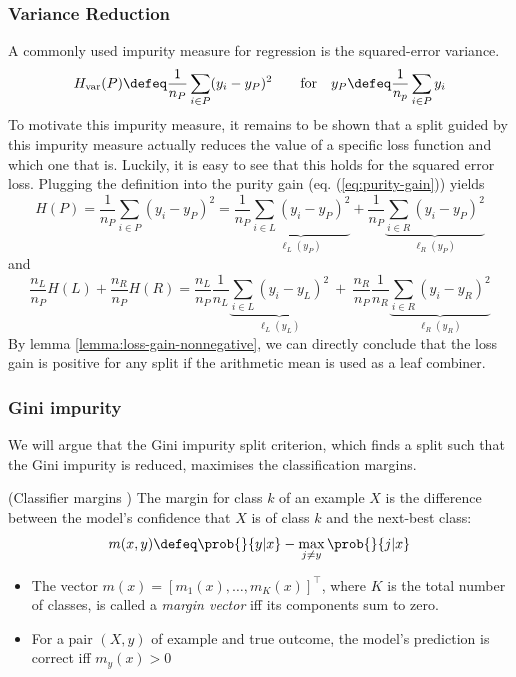 \documentclass[
	twoside=false, %
]{kaobook}
\begin{document}
\subsubsection{Variance Reduction}
A commonly used impurity measure for regression is the squared-error variance. 
$$
H_{\text{var}}(P) \defeq \frac{1}{n_{P}} \sum_{i \in P} (y_{i} - y_{P})^2 \hspace{2em} \text{for} \hspace{1em} y_{P} \defeq \frac{1}{n_{p}}\sum_{i\in P}y_{i}
$$
To motivate this impurity measure, it remains to be shown that a split guided by this impurity measure actually reduces the value of a specific loss function and which one that is. Luckily, it is easy to see that this holds for the squared error loss. Plugging the definition into the purity gain (eq. (\ref{eq:purity-gain})) yields
$$
H(P) = \frac{1}{n_{P}} \sum_{i \in P} (y_{i} - y_{P})^2
= \frac{1}{n_{P}}  
\underbrace{
 \sum_{i \in L} (y_{i} - y_P)^2 
 }_{\ell_{L}(y_{P})}
 +
\frac{1}{n_{P}}
 \underbrace{
 \sum_{i \in R} (y_{i} - y_{P}) ^2
 }_{\ell_{R}(y_{P})}
$$
and
$$
\frac{n_{L}}{n_{P}} H(L) +
\frac{n_{R}}{n_{P}} H(R) = 
\frac{n_{L}}{n_{P}} \frac{1}{n_{L}} 
\underbrace{
\sum_{i \in L} (y_{i} - y_{L})^2
}_{\ell_{L}(y_{L})}
~ + ~ 
\frac{n_{R}}{n_{P}} \frac{1}{n_{R}}
\underbrace{
 \sum_{i \in R} (y_{i} - y_{R})^2
}_{\ell_{R}(y_{R})}
$$
By lemma \ref{lemma:loss-gain-nonnegative}, we can directly conclude that the loss gain is positive for any split if the arithmetic mean is used as a leaf combiner.

\subsubsection{Gini impurity}
We will argue that the Gini impurity split criterion, which finds a split such that the Gini impurity is reduced, maximises the classification margins.

\begin{definition} (Classifier margins \cite{tibshirani_ElementsStatisticalLearning_2017}) The margin for class $k$ of an example $X$ is the difference between the model's confidence that $X$ is of class $k$ and the next-best class:
$$
m(x,y) \defeq \prob{}{y|x} - \max_{j\not=y} \prob{}{j|x}
$$
\begin{itemize}
    \item The vector $m(x) = [m_{1}(x), \dots, m_{K}(x)]^\top$, where $K$ is the total number of classes, is called a \textit{margin vector} iff its components sum to zero. 
    \item For a pair $(X,y)$ of example and true outcome, the model's prediction is correct iff $m_y(x) > 0$ 
\end{itemize}
\label{def:classifier-margin}
\end{definition}
\end{document}
